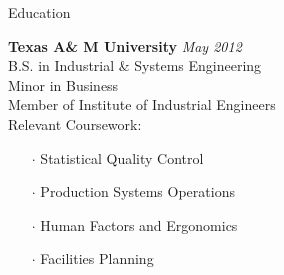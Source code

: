 \documentclass{resume} %
\begin{document}

\begin{rSection}{Education}

{\bf Texas A\& M University} \hfill {\em May 2012} \\ 
B.S. in Industrial \&  Systems Engineering \\
Minor in Business \smallskip \\
Member of Institute of Industrial Engineers \\
Relevant Coursework:
\begin{itemize} \itemsep0pt \parskip0pt
	\item[$\cdot$] Statistical Quality Control
	\item[$\cdot$] Production Systems Operations
	\item[$\cdot$] Human Factors and Ergonomics
	\item[$\cdot$] Facilities Planning
\end{itemize}
\end{rSection}

\end{document}
